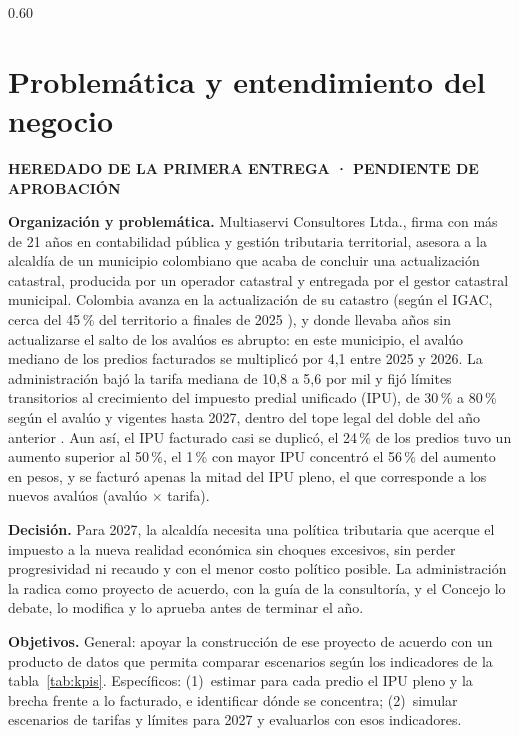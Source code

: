 \documentclass[12pt,letterpaper]{article}
\newcommand{\heredado}{\par\noindent\colorbox{amarillo}{\footnotesize\bfseries
  HEREDADO DE LA PRIMERA ENTREGA · PENDIENTE DE APROBACIÓN}\par\smallskip}
\begin{document}
\begin{espacio}{0.60}
\section{Problemática y entendimiento del negocio} %
\heredado
\textbf{Organización y problemática.} Multiaservi Consultores Ltda., firma con más de 21 años
en contabilidad pública y gestión tributaria territorial, asesora a la alcaldía de un municipio
colombiano que acaba de concluir una actualización catastral, producida por un operador catastral
y entregada por el gestor catastral municipal. Colombia avanza en la actualización de su catastro
(según el IGAC, cerca del 45\,\% del territorio a finales de 2025 \cite{portafolio2025igac}), y
donde llevaba años sin actualizarse el salto de los avalúos es abrupto: en este municipio, el
avalúo mediano de los predios facturados se multiplicó por 4,1 entre 2025 y 2026. La
administración bajó la tarifa mediana de 10,8 a 5,6 por mil y fijó límites transitorios al
crecimiento del impuesto predial unificado (IPU), de 30\,\% a 80\,\% según el avalúo y vigentes
hasta 2027, dentro del tope legal del doble del año anterior \cite{ley44}. Aun así, el IPU
facturado casi se duplicó, el 24\,\% de los predios tuvo un aumento superior al 50\,\%, el 1\,\%
con mayor IPU concentró el 56\,\% del aumento en pesos, y se facturó apenas la mitad del IPU
pleno, el que corresponde a los nuevos avalúos (avalúo $\times$ tarifa).

\textbf{Decisión.} Para 2027, la alcaldía necesita una política tributaria que acerque el
impuesto a la nueva realidad económica sin choques excesivos, sin perder progresividad ni recaudo
y con el menor costo político posible. La administración la radica como proyecto de acuerdo, con
la guía de la consultoría, y el Concejo lo debate, lo modifica y lo aprueba antes de terminar el
año.

\textbf{Objetivos.} General: apoyar la construcción de ese proyecto de acuerdo con un producto de
datos que permita comparar escenarios según los indicadores de la tabla~\ref{tab:kpis}.
Específicos: (1)~estimar para cada predio el IPU pleno y la brecha frente a lo facturado, e
identificar dónde se concentra; (2)~simular escenarios de tarifas y límites para 2027 y
evaluarlos con esos indicadores.


\end{espacio}
\end{document}
